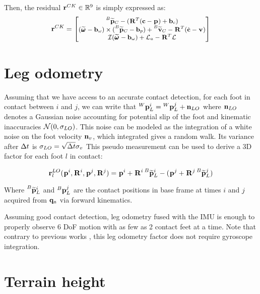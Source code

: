 Then, the residual ${\bf r}^{CK} \in \mathbb{R}^9$ is simply expressed as:
%
\begin{equation}
\small
{\bf r}^{CK}=
\begin{bmatrix}
\prescript{B}{}{\widetilde{{\bf p}}}_{C} - (\prescript{}{}{{\bf R}}_{}^T({\bf c} - \prescript{}{}{{\bf p}}_{}) + {\bf b}_{c})
\\
(\prescript{}{}{\widetilde{\pmb{\omega}}}_{} - {\bf b}_{\omega}) \times (\prescript{B}{}{\widetilde{{\bf p}}}_{C} -  {\bf b}_{p}) + \prescript{B}{}{\widetilde{{\bf v}}}_{C} - \prescript{}{}{{\bf R}}_{}^T(\dot{{\bf c}} - \prescript{}{}{{\bf v}}_{})
\\
\mathcal{I} (\prescript{}{}{\widetilde{\pmb{\omega}}}_{} - {\bf b}_{\omega}) + \mathcal{L}_a - \prescript{}{}{{\bf R}}_{}^T\mathcal{L}
\end{bmatrix}
\label{eq:CKFactor}
\end{equation}



\section{Leg odometry}
Assuming that we have access to an accurate contact detection, for each foot in contact between \keyframes $i$ and $j$, we can write that 
$\prescript{W}{}{{\bf p}}_{L}^i = \prescript{W}{}{{\bf p}}_{L}^j + {\bf n}_{LO}$ where ${\bf n}_{LO}$ denotes a Gaussian noise accounting for potential slip of the foot and kinematic inaccuracies 
$\mathcal{N}({0},{\sigma_{LO}})$.
This noise can be modeled as the integration of a white noise on the foot velocity ${\bf n}_v$, which integrated gives a random walk.  
Its variance after $\Delta t$ is $\sigma_{LO} = \sqrt{\Delta t} \sigma_v$
This pseudo measurement can be used to derive a 3D factor for each foot $l$ in contact:

\begin{equation}
    {\bf r}^{LO}_l(\prescript{}{}{{\bf p}}_{}^i, \prescript{}{}{{\bf R}}_{}^i, \prescript{}{}{{\bf p}}_{}^j, \prescript{}{}{{\bf R}}_{}^j) = \prescript{}{}{{\bf p}}_{}^i + \prescript{}{}{{\bf R}}_{}^i \prescript{B}{}{\widetilde{{\bf p}}}_{L}^i - (\prescript{}{}{{\bf p}}_{}^j + \prescript{}{}{{\bf R}}_{}^j \prescript{B}{}{\widetilde{{\bf p}}}_{L}^j)
\end{equation}

Where $\prescript{B}{}{\widetilde{{\bf p}}}_{L}^i$ and $\prescript{B}{}{{\bf p}}_{L}^j$ are the contact positions in base frame at times $i$ and $j$ acquired from ${\bf q}_a$ via forward kinematics. 

Assuming good contact detection, leg odometry fused with the IMU is enough to properly observe 6 DoF motion with as few as 2 contact feet at a time. 
Note that contrary to previous works \cite{hartley2018legged, wisth2020preintegrated}, this leg odometry factor does not require gyroscope integration.


\section{Terrain height}

